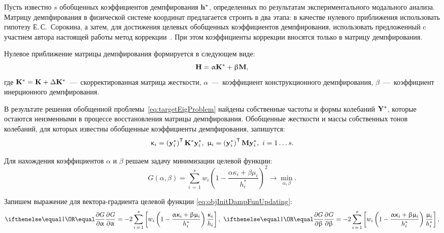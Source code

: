 Пусть известно $ s $ обобщенных коэффициентов демпфирования $ \mathbf{h} ^ \ast $, определенных по результатам экспериментального модального анализа. Матрицу демпфирования в физической системе координат предлагается строить в два этапа: в качестве нулевого приближения использовать гипотезу Е.\,С.~Сорокина, а затем, для достижения целевых обобщенных коэффициентов демпфирования, использовать предложенный c участием автора настоящей работы метод коррекции~\cite{lib:author:shortUpdating}. При этом коэффициенты коррекции вносятся только в матрицу демпфирования.

Нулевое приближение матрицы демпфирования формируется в следующем виде:
\begin{equation}
	\mathbf{H} = \upalpha \mathbf{K} ^ \ast + \upbeta \mathbf{M},
\end{equation}
где $ \mathbf{K} ^ \ast = \mathbf{K} + \Delta \mathbf{K} ^ \ast $~---~скорректированная матрица жесткости, $ \alpha $~---~коэффициент конструкционного демпфирования, $ \beta $~---~коэффициент инерционного демпфирования.

В результате решения обобщенной проблемы~\eqref{eq:targetEigProblem} найдены собственные частоты и формы колебаний $ \mathbf{Y} ^ \ast $, которые остаются неизменными в процессе восстановления матрицы демпфирования. Обобщенные жесткости и массы собственных тонов колебаний, для которых известны обобщенные коэффициенты демпфирования, запишутся:
\begin{equation}
	\upkappa_i = \left( \mathbf{y}_i ^ \ast \right) ^ \mathsf{T} \mathbf{K} ^ \ast \mathbf{y}_i ^ \ast, \
	\upmu_i = \left( \mathbf{y}_i ^ \ast \right) ^ \mathsf{T} \mathbf{M} \mathbf{y}_i ^ \ast, \ i = 1 \hdots s. 
\end{equation}

Для нахождения коэффициентов $ \alpha $ и $ \beta $ решаем задачу минимизации целевой функции:
\begin{equation}
	G(\alpha, \beta) = \sum \limits_{i\,=\,1} ^ s w_i \left( 1 - \frac{\alpha \kappa_i + \beta \mu_i}{h_i ^ \ast} \right)^2 \rightarrow \min_{\alpha, \beta}.
	\label{eq:objInitDampFunUpdating}
\end{equation}

Запишем выражение для вектора-градиента целевой функции \eqref{eq:objInitDampFunUpdating}:
\begin{equation*}
	\partDer{G}{\alpha}{} = -2 \sum_{i\,=\,1} ^ s \sbrackets{w_i \rbrackets{1 - \frac{\alpha \kappa_i + \beta \mu_i}{h_i ^ \ast}} \frac{\kappa_i}{h_i}}, \
	 \partDer{G}{\beta}{} = -2 \sum_{i\,=\,1} ^ s \sbrackets{w_i \rbrackets{1 - \frac{\alpha \kappa_i + \beta \mu_i}{h_i ^ \ast}} \frac{\mu_i}{h_i ^ \ast}},
\end{equation*}

